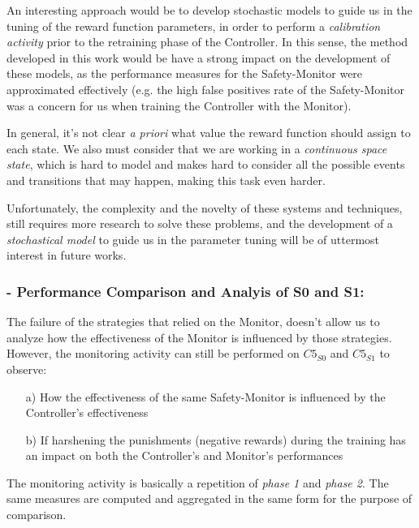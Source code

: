 An interesting approach would be to develop stochastic models to guide us in the tuning of the reward function parameters, in order to perform a \textsl{calibration activity} prior to the retraining phase of the Controller. In this sense, the method developed in this work would be have a strong impact on the development of these models, as the performance measures for the Safety-Monitor were approximated effectively (e.g. the high false positives rate of the Safety-Monitor was a concern for us when training the Controller with the Monitor).\newline

In general, it's not clear \textsl{a priori} what value the reward function should assign to each state. We also must consider that we are working in a \textsl{continuous space state}, which is hard to model and makes hard to consider all the possible events and transitions that may happen, making this task even harder.

Unfortunately, the complexity and the novelty of these systems and techniques, still requires more research to solve these problems, and the development of a \textsl{stochastical model} to guide us in the parameter tuning will be of uttermost interest in future works.




\subsubsection{- Performance Comparison and Analyis of S0 and S1:}

The failure of the strategies that relied on the Monitor, doesn't allow us to analyze how the effectiveness of the Monitor is influenced by those strategies. However, the monitoring activity can still be performed on $C5_{S0}$ and $C5_{S1}$ to observe:

\begin{itemize}
	\item[a)] How the effectiveness of the same Safety-Monitor is influenced by the Controller's effectiveness
	\item[b)] If harshening the punishments (negative rewards) during the training has an impact on both the Controller's and Monitor's performances
\end{itemize}

The monitoring activity is basically a repetition of \textsl{phase 1} and \textsl{phase 2}. The same measures are computed and aggregated in the same form for the purpose of comparison.

